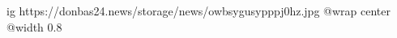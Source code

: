  
 
 
 
 

\ifcmt
  ig https://donbas24.news/storage/news/owbsygusypppj0hz.jpg
  @wrap center
  @width 0.8
\fi

